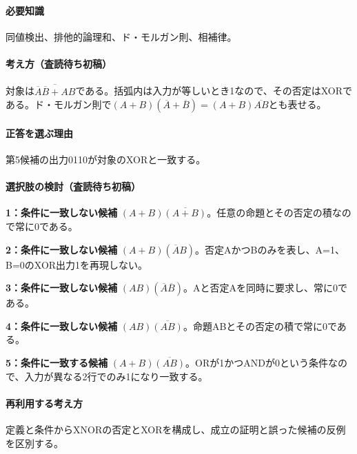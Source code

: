 \paragraph{必要知識} 同値検出、排他的論理和、ド・モルガン則、相補律。

\paragraph{考え方（査読待ち初稿）} 対象は\(\overline{\overline A\overline B+AB}\)である。括弧内は入力が等しいとき1なので、その否定はXORである。ド・モルガン則で\((A+B)(\overline A+\overline B)=(A+B)\overline{AB}\)とも表せる。

\paragraph{正答を選ぶ理由} 第5候補の出力0110が対象のXORと一致する。

\paragraph{選択肢の検討（査読待ち初稿）}\mbox{}\par

\noindent\textbf{1：条件に一致しない候補} \((A+B)\overline{(A+B)}\)。任意の命題とその否定の積なので常に0である。\par

\noindent\textbf{2：条件に一致しない候補} \((A+B)(\overline A B)\)。否定AかつBのみを表し、A=\allowbreak{}1、B=\allowbreak{}0のXOR出力1を再現しない。\par

\noindent\textbf{3：条件に一致しない候補} \((AB)(\overline A\overline B)\)。Aと否定Aを同時に要求し、常に0である。\par

\noindent\textbf{4：条件に一致しない候補} \((AB)\overline{(AB)}\)。命題ABとその否定の積で常に0である。\par

\noindent\textbf{5：条件に一致する候補} \((A+B)\overline{(AB)}\)。ORが1かつANDが0という条件なので、入力が異なる2行でのみ1になり一致する。\par

\paragraph{再利用する考え方} 定義と条件からXNORの否定とXORを構成し、成立の証明と誤った候補の反例を区別する。

